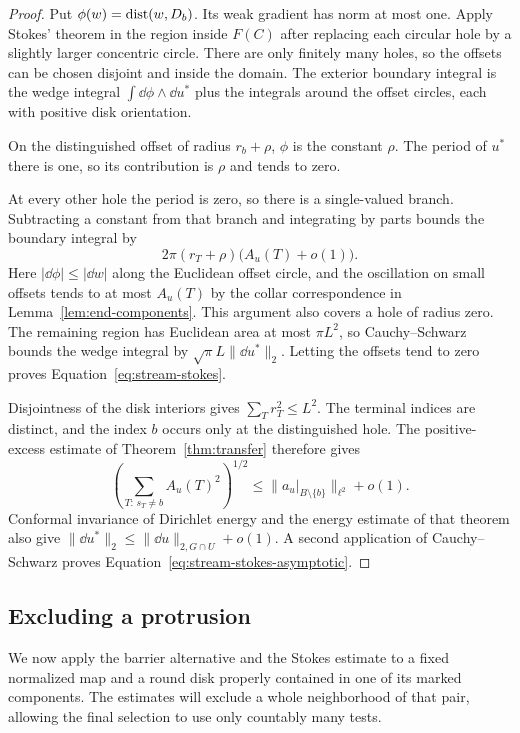 \begin{proof}
Put $\phi(w)=\operatorname{dist}(w,D_b)$.  Its weak gradient has norm at most one.
Apply Stokes' theorem in the region inside $F(C)$ after replacing each
circular hole by a slightly larger concentric circle.  There are only
finitely many holes, so the offsets can be chosen disjoint and inside
the domain.  The exterior boundary integral is the wedge integral
$\int\dd\phi\wedge\dd u^*$ plus the integrals around the offset
circles, each with positive disk orientation.

On the distinguished offset of radius $r_b+\rho$, $\phi$ is the
constant $\rho$.  The period of $u^*$ there is one, so its contribution
is $\rho$ and tends to zero.

At every other hole the period is zero, so there is a single-valued
branch.  Subtracting a constant from that branch and integrating by
parts bounds the boundary integral by
\[
 2\pi(r_T+\rho)\bigl(A_u(T)+o(1)\bigr).
\]
Here $|\dd\phi|\le|\dd w|$ along the Euclidean offset circle, and
the oscillation on small offsets tends
to at most $A_u(T)$ by the collar correspondence in
Lemma~\ref{lem:end-components}.  This argument also covers a hole of
radius zero.  The remaining region has Euclidean area at most
$\pi L^2$, so Cauchy--Schwarz bounds the wedge integral by
$\sqrt\pi L\|\dd u^*\|_2$.  Letting the offsets
tend to zero proves Equation~\eqref{eq:stream-stokes}.

Disjointness of the disk interiors gives $\sum_T r_T^2\le L^2$.
The terminal indices are distinct, and the index $b$ occurs only at
the distinguished hole.  The positive-excess estimate of
Theorem~\ref{thm:transfer} therefore gives
\[
 \left(\sum_{T:\,s_T\ne b}A_u(T)^2\right)^{1/2}
 \le \|a_u|_{B\setminus\{b\}}\|_{\ell^2}+o(1).
\]
Conformal invariance of Dirichlet energy and the energy estimate of
that theorem also give
$\|\dd u^*\|_2\le\|\dd u\|_{2,G\cap U}+o(1)$.
A second application of Cauchy--Schwarz proves
Equation~\eqref{eq:stream-stokes-asymptotic}.
\end{proof}

\subsection{Excluding a protrusion}

We now apply the barrier alternative and the Stokes estimate to a fixed
normalized map and a round disk properly contained in one of its marked
components.  The estimates will exclude a whole neighborhood of that
pair, allowing the final selection to use only countably many tests.

